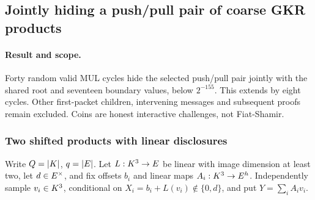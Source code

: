 \subsection{Jointly hiding a push/pull pair of coarse GKR products}\label{note:zk-gkr-paired}

\paragraph{Result and scope.} Forty random valid MUL cycles hide the selected push/pull pair jointly with the shared root and seventeen boundary values, below $2^{-155}$. This extends  by eight cycles. Other first-packet children, intervening messages and subsequent proofs remain excluded. Coins are honest interactive challenges, not Fiat-Shamir.

\subsubsection{Two shifted products with linear disclosures}

Write $Q=|K|$, $q=|E|$. Let $L:K^3\to E$ be linear with image dimension at least two, let $d\in E^\times$, and fix offsets $b_i$ and linear maps $A_i:K^3\to E^h$. Independently sample $v_i\in K^3$, conditional on $X_i=b_i+L(v_i)\notin\{0,d\}$, and put $Y=\sum_i A_iv_i$.

